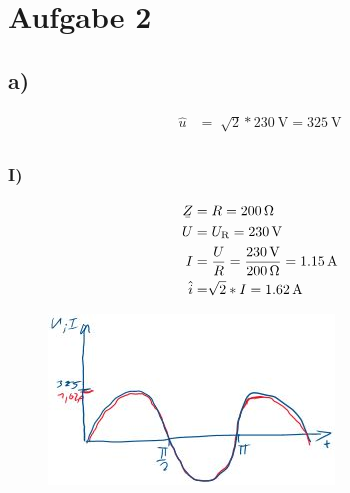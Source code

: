 \documentclass[../../document.tex]{subfiles}
\begin{document}
\section*{Aufgabe 2}

\subsection*{a)}

\begin{equation*}
    \begin{split}
        \hat{u} &= \sqrt[]{2} * \SI{230}{\volt} = \SI{325}{\volt}\\
    \end{split}
\end{equation*}

\subsubsection*{I)}

\begin{equation*}
    \begin{split}
        \ubar{Z} &= R = \SI{200}{\ohm}\\
        U &= U\cind{R} = \SI{230}{\volt}\\
        I &= \frac{U}{R} = \frac{\SI{230}{\volt}}{\SI{200}{\ohm}} = \SI{1,15}{\ampere}\\
        \hat{i} &= \sqrt[]{2} *I = \SI{1,62}{\ampere}\\
    \end{split}
\end{equation*}

\begin{figure}[H]
    \begin{center}
        \includegraphics[width=.9\linewidth]{../../img/task1-a-i.jpeg}
    \end{center}
\end{figure}
\end{document}
